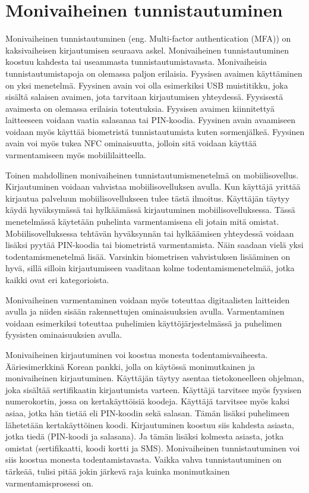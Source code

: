 \section{Monivaiheinen tunnistautuminen}

Monivaiheinen tunnistautuminen (eng. Multi-factor authentication (MFA)) on kaksivaiheisen kirjautumisen seuraava askel. Monivaiheinen tunnistautuminen koostuu kahdesta tai useammasta tunnistautumistavasta. \citep{two_factor_multi_factor_difference}
Monivaiheisia tunnistautumistapoja on olemassa paljon erilaisia. Fyysisen avaimen käyttäminen on yksi menetelmä. Fyysinen avain voi olla esimerkiksi USB muistitikku, joka sisältä salaisen avaimen, jota tarvitaan kirjautumisen yhteydessä. Fyysisestä avaimesta on olemassa erilaisia toteutuksia. Fyysisen avaimen kiinnitettyä laitteeseen voidaan vaatia salasanaa tai PIN-koodia. Fyysinen avain avaamiseen voidaan myös käyttää biometristä tunnistautumista kuten sormenjälkeä. Fyysinen avain voi myös tukea NFC ominaisuutta, jolloin sitä voidaan käyttää varmentamiseen myös mobiililaitteella.

Toinen mahdollinen monivaiheinen tunnistautumismenetelmä on mobiilisovellus. Kirjautuminen voidaan vahvistaa mobiilisovelluksen avulla. Kun käyttäjä yrittää kirjautua palveluun mobiilisovellukseen tulee tästä ilmoitus. Käyttäjän täytyy käydä hyväksymässä tai hylkäämässä kirjautuminen mobiilisovelluksessa. Tässä menetelmässä käytetään puhelinta varmentamisena eli jotain mitä omistat. Mobiilisovelluksessa tehtävän hyväksynnän tai hylkäämisen yhteydessä voidaan lisäksi pyytää PIN-koodia tai biometristä varmentamista. Näin saadaan vielä yksi todentamismenetelmä lisää. Varsinkin biometrisen vahvistuksen lisääminen on hyvä, sillä silloin kirjautumiseen vaaditaan kolme todentamismenetelmää, jotka kaikki ovat eri kategorioista. 

Monivaiheinen varmentaminen voidaan myös toteuttaa digitaalisten laitteiden avulla ja niiden sisään rakennettujen ominaisuuksien avulla. Varmentaminen voidaan esimerkiksi toteuttaa puhelimien käyttöjärjestelmässä ja puhelimen fyysisten ominaisuuksien avulla. 

Monivaiheinen kirjautuminen voi koostua monesta todentamisvaiheesta. Ääriesimerkkinä Korean pankki, jolla on käytössä monimutkainen ja monivaiheinen kirjautuminen. Käyttäjän täytyy asentaa tietokoneelleen ohjelman, joka sisältää sertifikaatin kirjautumista varteen. Käyttäjä tarvitsee myös fyysisen numerokortin, jossa on kertakäyttöisiä koodeja. Käyttäjä tarvitsee myös kaksi asiaa, jotka hän tietää eli PIN-koodin sekä salasan. Tämän lisäksi puhelimeen lähetetään kertakäyttöinen koodi.
Kirjautuminen koostuu siis kahdesta asiasta, jotka tiedä (PIN-koodi ja salasana). Ja tämän lisäksi kolmesta asiasta, jotka omistat (sertifikaatti, koodi kortti ja SMS). Monivaiheinen tunnistautuminen voi siis koostua monesta todentamistavasta. Vaikka vahva tunnistautuminen on tärkeää, tulisi pitää jokin järkevä raja kuinka monimutkainen varmentamisprosessi on. \citep{rittenhouse2015survey}
